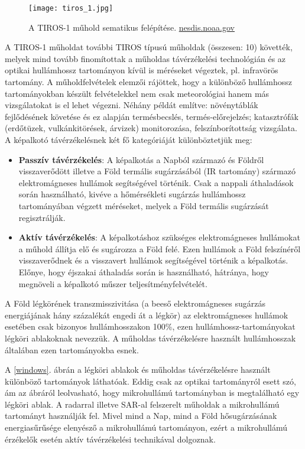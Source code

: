 \documentclass[12pt]{report}
\numberwithin{equation}{section}
\numberwithin{table}{section}
\numberwithin{figure}{section}
\begin{document}
\begin{figure}[H]
    \centering
    \texttt{[image: tiros\_1.jpg]}
    \caption{A TIROS-1 műhold sematikus felépítése. \url{nesdis.noaa.gov}}\label{tiros}
\end{figure}

A TIROS-1 műholdat további TIROS típusú műholdak (összesen: 10) követték, melyek mind tovább finomítottak a műholdas távérzékelési technológián és az optikai hullámhossz tartományon kívül is méréseket végeztek, pl. infravörös tartomány. A műholdfelvételek elemzői rájöttek, hogy a különböző hullámhossz tartományokban készült felvételekkel nem csak meteorológiai hanem más vizsgálatokat is el lehet végezni. Néhány példát említve: növénytáblák fejlődésének követése és ez alapján termésbecslés, termés-előrejelzés; katasztrófák (erdőtüzek, vulkánkitörések, árvizek) monitorozása, felszínborítottság vizsgálata.\\[15pt]
A képalkotó távérzékelésnek két fő kategóriáját különböztetjük meg:
\begin{itemize}
    \item \textbf{Passzív távérzékelés}: A képalkotás a Napból származó és Földről visszaverődött illetve a Föld termális sugárzásából (IR tartomány) származó elektromágneses hullámok segítségével történik. Csak a nappali áthaladások során használható, kivéve a hőmérsékleti sugárzás hullámhossz tartományában végzett méréseket, melyek a Föld termális sugárzását regisztrálják.
    \item \textbf{Aktív távérzékelés}: A képalkotáshoz szükséges elektromágneses hullámokat a műhold állítja elő és sugározza a Föld felé. Ezen hullámok a Föld felszínéről visszaverődnek és a visszavert hullámok segítségével történik a képalkotás. Előnye, hogy éjszakai áthaladás során is használható, hátránya, hogy megnöveli a képalkotó műszer teljesítményfelvételét.
\end{itemize}

A Föld légkörének transzmisszivitása (a beeső elektromágneses sugárzás energiájának hány százalékát engedi át a légkör) az elektromágneses hullámok esetében csak bizonyos hullámhosszakon 100\%, ezen hullámhossz-tartományokat légköri ablakoknak nevezzük. A műholdas távérzékelésre használt hullámhosszak általában ezen tartományokba esnek.

A \ref{windows}. ábrán a légköri ablakok és műholdas távérzékelésre használt különböző tartományok láthatóak. Eddig csak az optikai tartományról esett szó, ám az ábráról leolvasható, hogy mikrohullámú tartományban is megtalálható egy légköri ablak. A radarral illetve SAR-al felszerelt műholdak a mikrohullámú tartományt használják fel. Mivel mind a Nap, mind a Föld hősugárzásának energiasűrűsége elenyésző a mikrohullámú tartományon, ezért a mikrohullámú érzékelők esetén aktív távérzékelési technikával dolgoznak.
\end{document}
